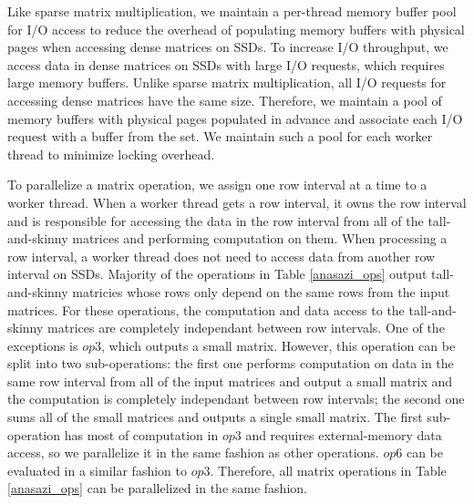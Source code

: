 Like sparse matrix multiplication, we maintain a per-thread memory buffer pool
for I/O access to reduce the overhead of populating memory buffers with
physical pages when accessing dense matrices on SSDs. To increase I/O throughput,
we access data in dense
matrices on SSDs with large I/O requests, which requires large memory buffers.
Unlike sparse matrix multiplication, all I/O requests for accessing dense
matrices have the same size. Therefore, we maintain a pool of memory buffers
with physical pages populated in advance and associate each I/O request with
a buffer from the set. We maintain such a pool for each worker thread to
minimize locking overhead.

To parallelize a matrix operation, we assign one row interval at a time to
a worker thread. When a worker thread gets a row interval, it owns the row
interval and is responsible for accessing the data in the row interval from
all of the tall-and-skinny matrices and performing computation on them.
When processing a row interval, a worker thread does not need to access data
from another row interval on SSDs.
Majority of the operations in Table \ref{anasazi_ops} output tall-and-skinny
matricies whose rows only depend on the same rows from the input matrices.
For these operations, the computation and data access to the tall-and-skinny
matrices are completely independant between row intervals. One of the exceptions is
$op3$, which outputs a small matrix. However, this operation can be split into
two sub-operations: the first one performs computation on data in the same row
interval from all of the input matrices and output a small matrix and the computation
is completely independant between row intervals; the second one sums all of
the small matrices and outputs a single small matrix. The first sub-operation
has most of computation in $op3$ and requires external-memory data access,
so we parallelize it in the same fashion as other operations.
$op6$ can be evaluated in a similar fashion to $op3$. Therefore, all matrix
operations in Table \ref{anasazi_ops} can be parallelized in the same fashion.


